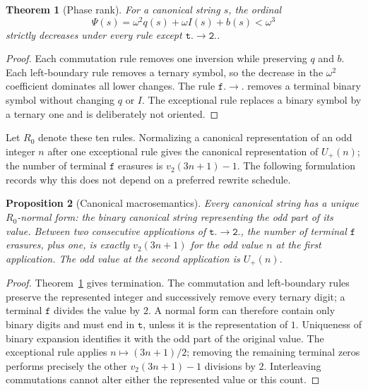 \documentclass[11pt,reqno]{amsart}
\newtheorem{theorem}{Theorem}[section]
\newtheorem{proposition}[theorem]{Proposition}
\theoremstyle{remark}
\newcommand{\Up}{U_{+}}
\newcommand{\vtwo}{v_2}
\begin{document}
\begin{theorem}[Phase rank]\label{thm:phase}
For a canonical string $s$, the ordinal
\[
 \Psi(s)=\omega^2q(s)+\omega I(s)+b(s)<\omega^3
\]
strictly decreases under every rule except
$\mathtt{t.}\to\mathtt{2.}$.
\end{theorem}

\begin{proof}
Each commutation rule removes one inversion while preserving $q$ and $b$.
Each left-boundary rule removes a ternary symbol, so the decrease in the
$\omega^2$ coefficient dominates all lower changes.  The rule
$\mathtt{f.}\to\mathtt{.}$ removes a terminal binary symbol without changing
$q$ or $I$.  The exceptional rule replaces a binary symbol by a ternary one
and is deliberately not oriented.
\end{proof}

Let $R_0$ denote these ten rules.  Normalizing a canonical representation of
an odd integer $n$ after one exceptional rule gives the canonical
representation of $\Up(n)$; the number of terminal $\mathtt f$ erasures is
$\vtwo(3n+1)-1$.  The following formulation records why this does not depend
on a preferred rewrite schedule.

\begin{proposition}[Canonical macrosemantics]\label{prop:macro}
Every canonical string has a unique $R_0$-normal form: the binary canonical
string representing the odd part of its value.  Between two consecutive
applications of $\mathtt{t.}\to\mathtt{2.}$, the number of terminal
$\mathtt f$ erasures, plus one, is exactly $\vtwo(3n+1)$ for the odd value
$n$ at the first application.  The odd value at the second application is
$\Up(n)$.
\end{proposition}

\begin{proof}
Theorem~\ref{thm:phase} gives termination.  The commutation and left-boundary
rules preserve the represented integer and successively remove every ternary
digit; a terminal $\mathtt f$ divides the value by $2$.  A normal form can
therefore contain only binary digits and must end in $\mathtt t$, unless it is
the representation of $1$.  Uniqueness of binary expansion identifies it with
the odd part of the original value.  The exceptional rule applies
$n\mapsto(3n+1)/2$; removing the remaining terminal zeros performs precisely
the other $\vtwo(3n+1)-1$ divisions by $2$.  Interleaving commutations cannot
alter either the represented value or this count.
\end{proof}
\end{document}
